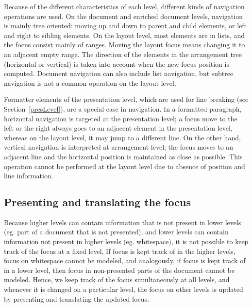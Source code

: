 Because of the different characteristics of each level, different kinds of navigation operations are used. On the document and enriched document levels, navigation is mainly tree oriented: moving up and down to parent and child elements, or left and right to sibling elements. On the layout level, most elements are in lists, and the focus consist mainly of ranges. Moving the layout focus means changing it to an adjacent empty range. The direction of the elements in the arrangement tree (horizontal or vertical) is taken into account when the new focus position is computed. Document navigation can also include list navigation, but subtree navigation is not a common operation on the layout level.


Formatter elements of the presentation level, which are used for line breaking (see Section~\ref{presLevel}), are a special case in navigation. In a formatted paragraph, horizontal navigation is targeted at the presentation level; a focus move to the left or the right always goes to an adjacent element in the presentation level, whereas on the layout level, it may jump to a different line. On the other hand, vertical navigation is interpreted at arrangement level; the focus moves to an adjacent line and the horizontal position is maintained as close as possible. This operation cannot be performed at the layout level due to absence of position and line information. 
 
 
%																
\subsection{Presenting and translating the focus}

Because higher levels can contain information that is not present in lower levels (eg. part of a document that is not presented), and lower levels can contain information not present in higher levels (eg. whitespace), it is not possible to keep track of the focus at a fixed level. If focus is kept track of in the higher levels, focus on whitespace cannot be modeled, and analogously, if focus is kept track of in a lower level, then focus in non-presented parts of the document cannot be modeled. Hence, we keep track of the focus simultaneously at all levels, and whenever it is changed on a particular level, the focus on other levels is updated by presenting and translating the updated focus.

